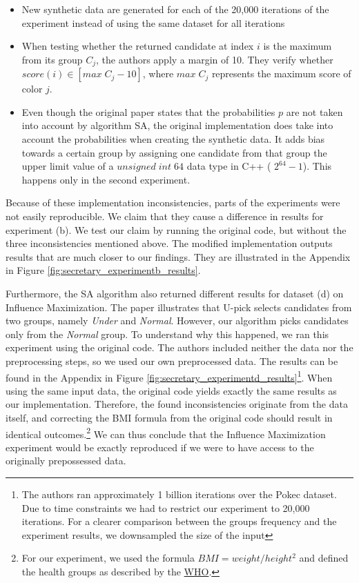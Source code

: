 \begin{itemize}
    \item New synthetic data are generated for each of the 20,000 iterations of the experiment instead of using the same dataset for all iterations
    \item When testing whether the returned candidate at index $i$ is the maximum from its group $C_j$, the authors apply a margin of 10. They verify whether $ score(i) \in [max\;C_j - 10]$, where $max\;C_j$ represents the maximum score of color $j$.
    \item Even though the original paper states that the probabilities $p$ are not taken into account by algorithm SA, the original implementation does take into account the probabilities when creating the synthetic data. It adds bias towards a certain group by assigning one candidate from that group the upper limit value of a $unsigned\;int\;64$ data type in C++ ( $2^{64} - 1$). This happens only in the second experiment.
\end{itemize}

Because of these implementation inconsistencies, parts of the experiments were not easily reproducible. We claim that they cause a difference in results for experiment (b). We test our claim by running the original code, but without the three inconsistencies mentioned above. The modified implementation outputs results that are much closer to our findings. They are illustrated in the Appendix in Figure \ref{fig:secretary_experimentb_results}.

Furthermore, the SA algorithm also returned different results for dataset (d) on Influence Maximization. The paper illustrates that U-pick selects candidates from two groups, namely \emph{Under} and \emph{Normal}. However, our algorithm picks candidates only from the \emph{Normal} group. To understand why this happened, we ran this experiment using the original code. The authors included neither the data nor the preprocessing steps, so we used our own preprocessed data. The results can be found in the Appendix in Figure \ref{fig:secretary_experimentd_results}\footnote{The authors ran approximately 1 billion iterations over the Pokec dataset. Due to time constraints we had to restrict our experiment to 20,000 iterations. For a clearer comparison between the groups frequency and the experiment results, we  downsampled the size of the input}. When using the same input data,  the original code yields exactly the same results as our implementation. Therefore, the found inconsistencies originate from the data itself, and correcting the BMI formula from the original code should result in identical outcomes.\footnote{For our experiment, we used the formula $BMI = weight/height^2$ and defined the health groups as described by the \hyperlink{https://www.euro.who.int/en/health-topics/disease-prevention/nutrition/a-healthy-lifestyle/body-mass-index-bmi}{WHO}.} We can thus conclude that the Influence Maximization experiment would be exactly reproduced if we were to have access to the originally prepossessed data.

